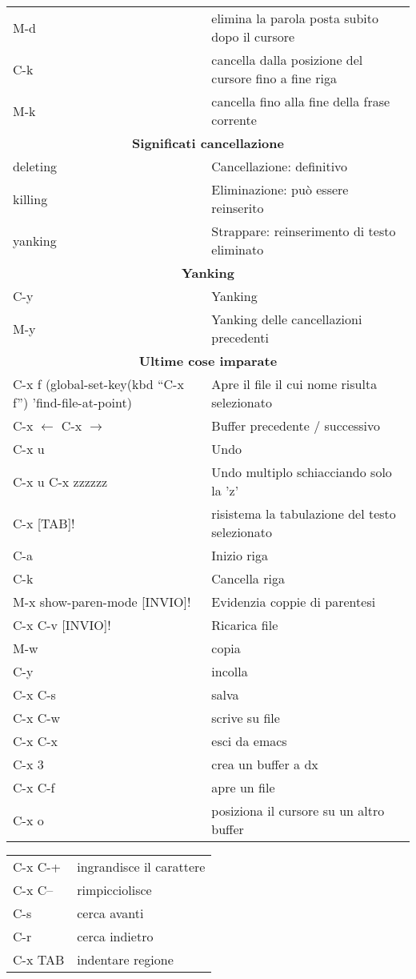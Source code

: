 \documentclass{article}
\begin{document}
\begin{tabular}{ll}
  M-d & elimina la parola posta subito dopo il cursore\\
  C-k & cancella dalla posizione del cursore fino a fine riga\\
  M-k & cancella fino alla fine della frase corrente\\
  \multicolumn{2}{c}{\textbf{Significati cancellazione}}\\
  deleting & Cancellazione: definitivo\\
  killing & Eliminazione: può essere reinserito\\
  yanking & Strappare: reinserimento di testo eliminato\\
  \multicolumn{2}{c}{\textbf{Yanking}}\\
  C-y & Yanking\\
  M-y & Yanking delle cancellazioni precedenti\\
  \multicolumn{2}{c}{\textbf{Ultime cose imparate}}\\
  C-x f (global-set-key(kbd ``C-x f'') 'find-file-at-point)  & Apre il file il cui nome risulta selezionato\\
  C-x $ \leftarrow $ C-x $ \rightarrow $ & Buffer precedente / successivo\\
  C-x u & Undo\\
  C-x u C-x zzzzzz & Undo multiplo schiacciando solo la 'z'\\
  C-x [TAB]! & risistema la tabulazione del testo selezionato\\
  C-a & Inizio riga\\
  C-k & Cancella riga\\
  M-x show-paren-mode [INVIO]! & Evidenzia coppie di parentesi\\
  C-x C-v [INVIO]! & Ricarica file\\
  M-w & copia\\
  C-y & incolla\\
  C-x C-s & salva\\
  C-x C-w & scrive su file\\
  C-x C-x & esci da emacs\\
  C-x 3 & crea un buffer a dx\\
  C-x C-f & apre un file\\
  C-x o & posiziona il cursore su un altro buffer\\
\end{tabular}
\newpage
\begin{tabular}{ll}  
  C-x C-+ & ingrandisce il carattere\\
  C-x C-- & rimpicciolisce\\
  C-s & cerca avanti\\
  C-r & cerca indietro\\
  C-x TAB & indentare regione\\
\end{tabular}
\end{document}
